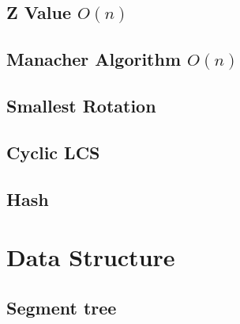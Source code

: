 \documentclass[a4paper,10pt,twocolumn,oneside]{article}
\begin{document}
%

\subsection{Z Value $O(n)$}


%

\subsection{Manacher Algorithm $O(n)$}


\subsection{Smallest Rotation}


%

\subsection{Cyclic LCS}


\subsection{Hash}
 


\section{Data Structure}

\subsection{Segment tree}

\end{document}
